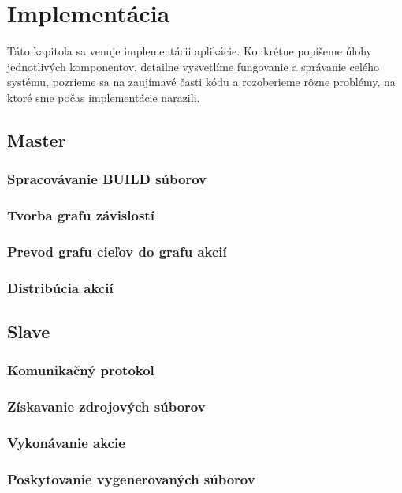 \chapter{Implement\'{a}cia}
\label{ch:impl}

Táto kapitola sa venuje implementácii aplikácie. Konkrétne popíšeme úlohy
jednotlivých komponentov, detailne vysvetlíme fungovanie a správanie celého
systému, pozrieme sa na zaujímavé časti kódu a rozoberieme rôzne problémy,
na ktoré sme počas implementácie narazili.

\section{Master}
\label{sec:master}

\subsection{Spracov\'{a}vanie BUILD s\'{u}borov}
\label{sec:master:buildfile}

\subsection{Tvorba grafu z\'{a}vislost\'{i}}
\label{sec:master:depgraph}

\subsection{Prevod grafu cie\v{l}ov do grafu akci\'{i}}
\label{sec:master:target2action}

\subsection{Distrib\'{u}cia akci\'{i}}
\label{sec:master:distribution}


\section{Slave}
\label{sec:slave}

\subsection{Komunika\v{c}n\'{y} protokol}
\label{sec:slave:protocol}

\subsection{Z\'{i}skavanie zdrojov\'{y}ch s\'{u}borov}
\label{sec:slave:retrieval}

\subsection{Vykon\'{a}vanie akcie}
\label{sec:slave:execution}

\subsection{Poskytovanie vygenerovan\'{y}ch s\'{u}borov}
\label{sec:slave:provision}
